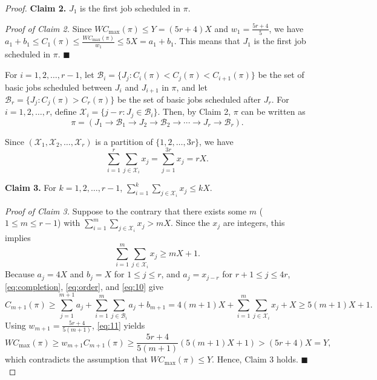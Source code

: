 \documentclass[12pt]{article}
\begin{document}
\begin{sloppypar}
\begin{proof}
            \textbf{Claim 2.} $J_1$ is the first job scheduled in $\pi$.
            
            \textit{Proof of Claim 2.}  Since $WC_{\max}(\pi) \leq Y=(5r+4)X$ and $w_1=\frac{5r+4}{5}$, we have $a_1+b_1 \leq C_1(\pi) \leq \frac{WC_{\max}(\pi)}{w_1} \leq 5X=a_1+b_1$. This means that $J_1$ is the first job scheduled in $\pi$.  \hfill$\blacksquare$
            
            For $i=1, 2, \ldots, r-1$, let $\mathcal{B}_i=\{J_j: C_i(\pi) < C_j(\pi) < C_{i+1}(\pi)\}$ be the set of basic jobs scheduled between $J_i$ and $J_{i+1}$ in $\pi$, and let $\mathcal{B}_r=\{J_j: C_j(\pi) > C_r(\pi)\}$ be the set of basic jobs scheduled after $J_r$. For $i=1, 2, \ldots, r$, define $\mathcal{X}_i=\{j-r: J_j \in  \mathcal{B}_i\}$. Then, by Claim 2, $\pi$ can be written as 
            \begin{equation} \label{eq:order}
                \pi=(J_1 \to \mathcal{B}_1 \to J_2 \to \mathcal{B}_2 \to \cdots \to J_r \to \mathcal{B}_r).
            \end{equation} 
            
            Since $(\mathcal{X}_1, \mathcal{X}_2, \ldots, \mathcal{X}_r)$ is a partition of $\{1, 2, \ldots, 3r\}$, we have 
            \begin{equation} \label{eq:00}
                \sum_{i=1}^r \sum_{j \in \mathcal{X}_i} x_j =\sum_{j=1}^{3r} x_j =rX.
            \end{equation} 
            
            \textbf{Claim 3.} For $k=1, 2, \ldots, r-1$, $\sum_{i=1}^k \sum_{j \in \mathcal{X}_i} x_j \leq kX$. 
            
            \textit{Proof of Claim 3.} Suppose to the contrary that there exists some $m$ ($1 \leq m \leq r-1$) with $\sum_{i=1}^m \sum_{j \in \mathcal{X}_i} x_j > mX$. Since the $x_j$ are integers, this implies 
            \begin{equation}\label{eq:10}
                \sum_{i=1}^m \sum_{j \in \mathcal{X}_i} x_j \geq mX+1. 
            \end{equation}
            Because $a_j=4X$ and $b_j=X$ for $1 \leq j \leq r$, and $a_j=x_{j-r}$ for $r+1 \leq j \leq 4r$, \cref{eq:completion}, \cref{eq:order}, and \cref{eq:10} give  
            \begin{equation} \label{eq:11}
                C_{m+1}(\pi) \geq \sum_{j=1}^{m+1} a_j+\sum_{i=1}^m \sum_{j \in \mathcal{B}_i} a_j+b_{m+1} =4(m+1)X+\sum_{i=1}^m \sum_{j \in \mathcal{X}_i} x_j +X \geq 5(m+1)X+1.
            \end{equation}
            Using $w_{m+1}=\frac{5r+4}{5(m+1)}$, \cref{eq:11} yields
            \begin{equation} \label{eq:12}
                W C_{\max}(\pi) \geq w_{m+1} C_{m+1}(\pi) \geq \frac{5r+4}{5(m+1)} (5(m+1)X+1)>(5r+4)X=Y,
            \end{equation} 
            which contradicts the assumption that $W C_{\max}(\pi) \leq Y$. Hence, Claim 3 holds. \hfill$\blacksquare$
            

\end{proof}
\end{sloppypar}
\end{document}
